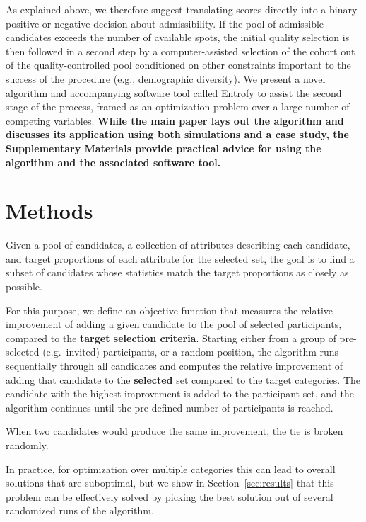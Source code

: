 \documentclass[12pt]{article}
\begin{document}
As explained above, we therefore suggest translating scores directly into a binary positive or negative decision about admissibility.
If the pool of admissible candidates exceeds the number of available spots, the initial quality selection is then followed in a second step by a computer-assisted selection of the cohort out of the quality-controlled pool conditioned on other constraints important to the success of the procedure (e.g., demographic diversity). We present a novel algorithm and accompanying software tool called Entrofy to assist the second stage of the process, framed as an optimization problem over a large number of competing variables. \textbf{While the main paper lays out the algorithm and discusses its application using both simulations and a case study, the Supplementary Materials provide practical advice for using the algorithm and the associated software tool.}

\section*{Methods}
\label{sec:algorithm}

\begin{bf}
Given a pool of candidates, a collection of attributes describing each candidate, and target proportions of each attribute for the selected set, the goal is to find a subset of candidates whose statistics match the target proportions as closely as possible. 
\end{bf}
For this purpose, we define an objective function that measures the relative improvement of adding a given candidate to the pool of selected participants, compared to the \textbf{target selection criteria}. Starting either from a group of pre-selected (e.g.\ invited) participants, or a random position, the algorithm runs sequentially through all candidates and computes the relative improvement of adding that candidate to the \textbf{selected} set compared to the target categories. The candidate with the highest improvement is added to the participant set, and the algorithm continues until the pre-defined number of participants is reached.

\begin{bf}When two candidates would produce the same improvement, the tie is broken randomly.\end{bf}
In practice, for optimization over multiple categories this can lead to overall solutions that are suboptimal, but we show in Section~\ref{sec:results} that this problem can be effectively solved by picking the best solution out of several randomized runs of the algorithm. 
\end{document}
